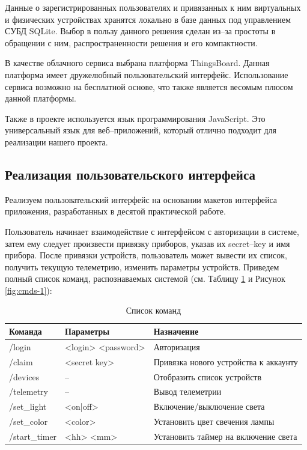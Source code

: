 \documentclass[a4paper,14pt]{extarticle}
\begin{document}
Данные о зарегистрированных пользователях и привязанных к ним виртуальных и физических устройствах хранятся локально в базе данных под управлением СУБД SQLite. 
Выбор в пользу данного решения сделан \mbox{из--за} простоты в обращении с ним, распространенности решения и его компактности.

В качестве облачного сервиса выбрана платформа ThingsBoard. 
Данная платформа имеет дружелюбный пользовательский интерфейс. Использование сервиса возможно на бесплатной основе, что также является весомым плюсом данной платформы.

Также в проекте используется язык программирования JavaScript. 
Это универсальный язык для веб--приложений, который отлично подходит для реализации нашего проекта.

\subsection{Реализация пользовательского интерфейса}

Реализуем пользовательский интерфейс на основании макетов интерфейса приложения, разработанных в десятой практической работе. 

Пользователь начинает взаимодействие с интерфейсом с авторизации в системе, затем ему следует произвести привязку приборов, указав их \mbox{secret--key} и имя прибора. 
После привязки устройств, пользователь может вывести их список, получить текущую телеметрию, изменить параметры устройств. Приведем полный список команд, распознаваемых системой (см. Таблицу \ref{tab:commands} и Рисунок \ref{fig:cmds-1}):
\begin{table}[h!]
	\caption{Список команд}
	\begin{tabular}{|l|l|l|}
		\hline
		\textbf{Команда} & \textbf{Параметры} & \textbf{Назначение}\\ \hline\hline
		/login & <login> <password> & Авторизация \\ \hline
		/claim & <secret key> & Привязка нового устройства к аккаунту \\ \hline
		/devices & -- & Отобразить список устройств \\ \hline
		/telemetry & -- & Вывод телеметрии \\ \hline
		/set\_light & <on|off> & Включение/выключение света \\ \hline
		/set\_color & <color> & Установить цвет свечения лампы \\ \hline
		/start\_timer & <hh> <mm> & Установить таймер на включение света \\ \hline
	\end{tabular}
	\label{tab:commands}
\end{table}
\end{document}
